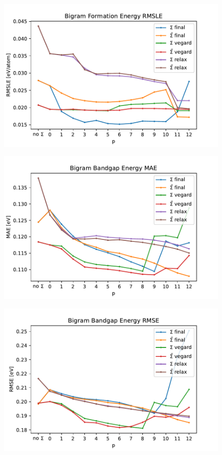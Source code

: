 \documentclass[11pt,oneside,czech,american]{book} %
\theoremstyle{definition} %
\theoremstyle{definition}
\begin{document}
\begin{figure}[H]
	\centering
	\includegraphics[scale=0.6]{bigram_RMSLE_form.pdf}
	\caption{}
	\label{}
\end{figure}
\begin{figure}[H]
	\centering
	\includegraphics[scale=0.6]{bigram_MAE_gap.pdf}
	\caption{}
	\label{}
\end{figure}
\begin{figure}[H]
	\centering
	\includegraphics[scale=0.6]{bigram_RMSE_gap.pdf}
	\caption{}
	\label{}
\end{figure}
\end{document}
